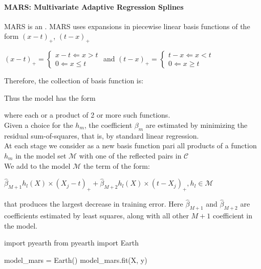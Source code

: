 \paragraph{MARS: Multivariate Adaptive Regression Splines}
MARS is an .
MARS uses expansions in piecewise linear basis functions of the form $(x-t)_{+}$, $(t-x)_{+}$
\begin{center}
	$(x-t)_{+} = \begin{cases} x-t \Leftarrow x>t\\ 0\Leftarrow x\leq t\end{cases}$ and 
$(t-x)_{+} = \begin{cases} t-x \Leftarrow x<t\\ 0\Leftarrow x\geq t\end{cases}$
\end{center}
Therefore, the collection of basis function is: 
\begin{center}
\end{center}
Thus the model has the form 
\begin{center}
\end{center}
where each  or a product of 2 or more such functions.\\
Given a choice for the $h_{m}$, the coefficient $\beta_{m}$ are estimated by minimizing the residual
sum-of-squares, that is, by standard linear regression.\\
At each stage we consider as a new basis function pari all products of a function $h_{m}$ in the 
model set $\mathcal{M}$ with one of the reflected pairs in $\mathcal{C}$\\
We add to the model $\mathcal{M}$ the term of the form:
\begin{center}
$\hat{\beta}_{M+1}h_{l}(X)\times(X_{j}-t)_{+}+\hat{\beta}_{M+2}h_{l}(X)\times(t-X_{j})_{+}, h_{l}\in
\mathcal{M}$
\end{center}
that produces the largest decrease in training error. Here $\hat{\beta}_{M+1}$ and $\hat{\beta}_{M+2
}$ are coefficients estimated by least squares, along with all other $M+1$ coefficient in the model.
\begin{python}
import pyearth
from pyearth import Earth

model_mars = Earth()
model_mars.fit(X, y)
\end{python}
